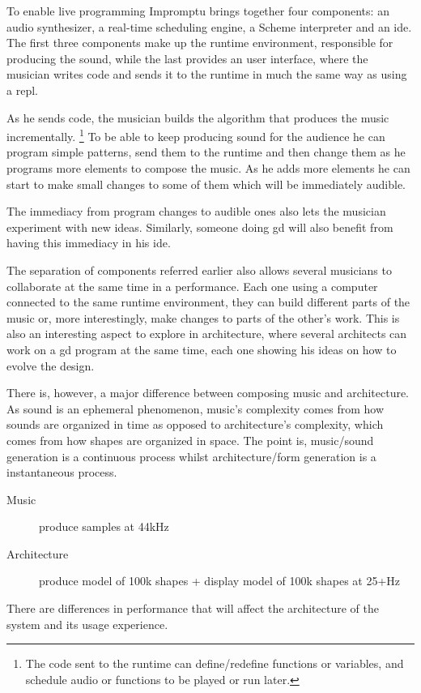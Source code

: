 To enable live programming Impromptu brings together four components: an audio synthesizer, a real-time scheduling engine, a Scheme interpreter and an \gls{ide}\cite{sorensen2005impromptu}.
The first three components make up the runtime environment, responsible for producing the sound, while the last provides an user interface, where the musician writes code and sends it to the runtime in much the same way as using a \gls{repl}.

As he sends code, the musician builds the algorithm that produces the music incrementally.%
\footnote{The code sent to the runtime can define/redefine functions or variables, and schedule audio or functions to be played or run later.}
To be able to keep producing sound for the audience he can program simple patterns, send them to the runtime and then change them as he programs more elements to compose the music.
As he adds more elements he can start to make small changes to some of them which will be immediately audible.

The immediacy from program changes to audible ones also lets the musician experiment with new ideas.
Similarly, someone doing \gls{gd} will also benefit from having this immediacy in his \gls{ide}.

The separation of components referred earlier also allows several musicians to collaborate at the same time in a performance\cite{sorensen2005impromptu}.
Each one using a computer connected to the same runtime environment, they can build different parts of the music or, more interestingly, make changes to parts of the other's work.
This is also an interesting aspect to explore in architecture, where several architects can work on a \gls{gd} program at the same time, each one showing his ideas on how to evolve the design.

There is, however, a major difference between composing music and architecture.
As sound is an ephemeral phenomenon, music's complexity comes from how sounds are organized in time as opposed to architecture's complexity, which comes from how shapes are organized in space.
The point is, music/sound generation is a continuous process whilst architecture/form generation is a instantaneous process.
\begin{description}
	\item[Music] produce samples at 44kHz
	\item[Architecture] produce model of 100k shapes + display model of 100k shapes at 25+Hz
\end{description}
There are differences in performance that will affect the architecture of the system and its usage experience.


